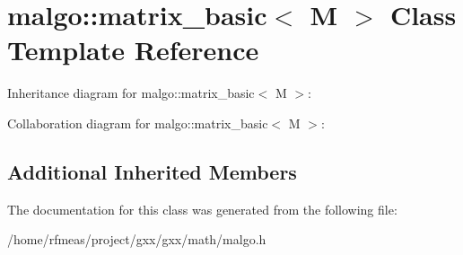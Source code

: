 \hypertarget{classmalgo_1_1matrix__basic}{}\section{malgo\+:\+:matrix\+\_\+basic$<$ M $>$ Class Template Reference}
\label{classmalgo_1_1matrix__basic}


Inheritance diagram for malgo\+:\+:matrix\+\_\+basic$<$ M $>$\+:


Collaboration diagram for malgo\+:\+:matrix\+\_\+basic$<$ M $>$\+:
\subsection*{Additional Inherited Members}


The documentation for this class was generated from the following file\+:\begin{DoxyCompactItemize}
\item 
/home/rfmeas/project/gxx/gxx/math/malgo.\+h\end{DoxyCompactItemize}
